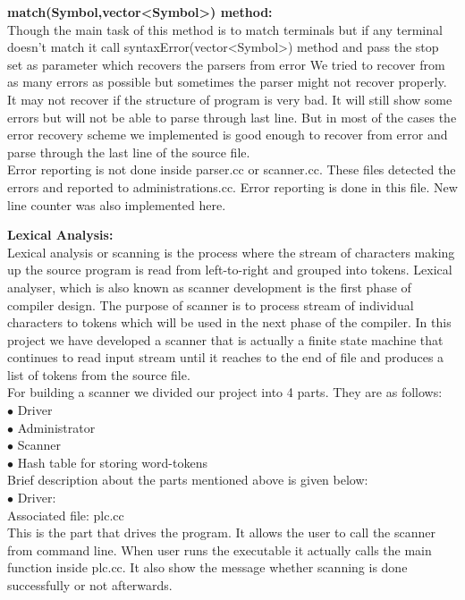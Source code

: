 \documentclass[paper=letter, fontsize=12pt]{scrartcl} %
\begin{document}
{\bf match(Symbol,vector<Symbol>) method:}\\
Though the main task of this method is to match terminals but if any terminal doesn't match it call syntaxError(vector<Symbol>) method and pass the stop set as parameter which recovers the parsers from error		
We tried to recover from as many errors as possible but sometimes the parser might not recover properly. It may not recover if the structure of program is very bad. It will still show some errors but will not be able to parse through last line. But in most of the cases the error recovery scheme we implemented is good enough to recover from error and parse through the last line of the source file.\\

Error reporting is not done inside parser.cc or scanner.cc. These files detected the errors and reported to administrations.cc. Error reporting is done in this file. New line counter was also implemented here.\\

\pagebreak

{\bf Lexical Analysis:}\\
Lexical analysis or scanning is the process where the stream of characters making up the source program is read from left-to-right and grouped into tokens. Lexical analyser, which is also known as scanner development is the first phase of compiler design. The purpose of scanner is to process stream of individual characters to tokens which will be used in the next phase of the compiler. In this project we have developed a scanner that is actually a finite state machine that continues to read input stream until it reaches to the end of file and produces a list of tokens from the source file.\\
For building a scanner we divided our project into 4 parts. They are as follows:\\
$\bullet$ Driver\\
$\bullet$ Administrator\\
$\bullet$ Scanner\\
$\bullet$ Hash table for storing word-tokens\\

Brief description about the parts mentioned above is given below:\\
$\bullet$ Driver:\\

Associated file: plc.cc\\
This is the part that drives the program. It allows the user to call the scanner from command line. When user runs the executable it actually calls the main function inside plc.cc. It also show the message whether scanning is done successfully or not afterwards.
\end{document}
